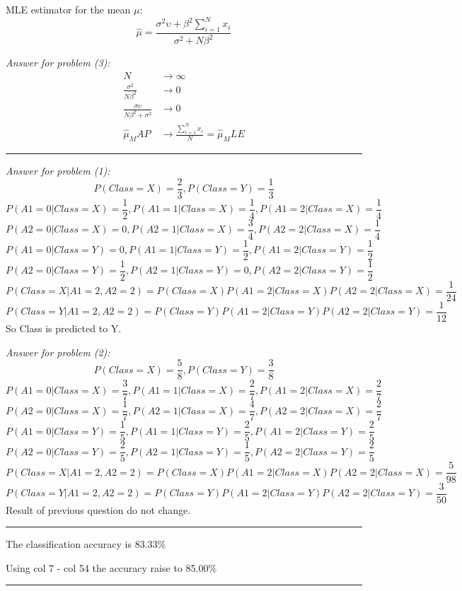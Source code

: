 \documentclass[twoside]{article}
\newenvironment{problem}[2][Problem]{\begin{trivlist}
		\item[\hskip \labelsep {\bfseries #1}\hskip \labelsep {\bfseries #2.}]}{\end{trivlist}}
\newenvironment{solution}{{\bf Solution:}}{\hfill\rule{2mm}{2mm}}
\begin{document}
\begin{solution}
MLE estimator for the mean $\mu$:
$$
\hat{\mu}=\frac{\sigma^2\upsilon+\beta^2\sum_{i=1}^{N}x_i}{\sigma^2+N\beta^2}
$$

\emph{Answer for problem (3):}
\begin{align*}
N &\rightarrow \infty \\
\frac{\sigma^2}{N\beta^2} &\rightarrow 0 \\
\frac{\sigma\upsilon}{N\beta^2+\sigma^2} &\rightarrow 0 \\
\hat{\mu}_MAP &\rightarrow \frac{\sum_{i=1}^{N}x_i}{N} = \hat{\mu}_MLE
\end{align*}
\end{solution}

\begin{problem}{3}
\end{problem}

\begin{solution}

\emph{Answer for problem (1):}
$$P(Class = X) = \frac{2}{3}, P(Class = Y) = \frac{1}{3}$$
$$
P(A1=0|Class = X) = \frac{1}{2},P(A1=1|Class = X) = \frac{1}{4},P(A1=2|Class = X) = \frac{1}{4}
$$
$$
P(A2=0|Class = X) = 0,P(A2=1|Class = X) = \frac{3}{4},P(A2=2|Class = X) = \frac{1}{4}
$$
$$
P(A1=0|Class = Y) = 0,P(A1=1|Class = Y) = \frac{1}{2},P(A1=2|Class =Y) = \frac{1}{2}
$$
$$
P(A2=0|Class = Y) = \frac{1}{2},P(A2=1|Class = Y) = 0,P(A2=2|Class =Y) = \frac{1}{2}
$$
$$
P(Class=X|A1=2,A2=2)=P(Class=X)P(A1=2|Class=X)P(A2=2|Class=X)=\frac{1}{24}
$$
$$
P(Class=Y|A1=2,A2=2)=P(Class=Y)P(A1=2|Class=Y)P(A2=2|Class=Y)=\frac{1}{12}
$$
So Class is predicted to Y.

\emph{Answer for problem (2):}
$$P(Class = X) = \frac{5}{8}, P(Class = Y) = \frac{3}{8}$$
$$
P(A1=0|Class = X) = \frac{3}{7},P(A1=1|Class = X) = \frac{2}{7},P(A1=2|Class = X) = \frac{2}{7}
$$
$$
P(A2=0|Class = X) = \frac{1}{7},P(A2=1|Class = X) = \frac{4}{7},P(A2=2|Class = X) = \frac{2}{7}
$$
$$
P(A1=0|Class = Y) = \frac{1}{5},P(A1=1|Class = Y) = \frac{2}{5},P(A1=2|Class =Y) = \frac{2}{5}
$$
$$
P(A2=0|Class = Y) = \frac{2}{5},P(A2=1|Class = Y) = \frac{1}{5},P(A2=2|Class =Y) = \frac{2}{5}
$$
$$
P(Class=X|A1=2,A2=2)=P(Class=X)P(A1=2|Class=X)P(A2=2|Class=X)=\frac{5}{98}
$$
$$
P(Class=Y|A1=2,A2=2)=P(Class=Y)P(A1=2|Class=Y)P(A2=2|Class=Y)=\frac{3}{50}
$$
Result of previous question do not change.
\end{solution}

\begin{problem}{4}
\end{problem} 
\begin{solution}
	
	The classification accuracy is 83.33\%
	
	Using col 7 - col 54 the accuracy raise to 85.00\%
\end{solution}
\end{document}
